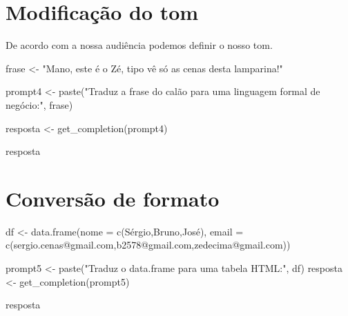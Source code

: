 \documentclass[
  letterpaper,
  paper=6in:9in,
  pagesize=pdftex,
  headinclude=on,
  footinclude=on,
  12pt]{scrbook}
\newenvironment{Shaded}{\begin{snugshade}}{\end{snugshade}}
\newcommand{\AttributeTok}[1]{\textcolor[rgb]{0.40,0.45,0.13}{#1}}
\newcommand{\FunctionTok}[1]{\textcolor[rgb]{0.28,0.35,0.67}{#1}}
\newcommand{\NormalTok}[1]{\textcolor[rgb]{0.00,0.23,0.31}{#1}}
\newcommand{\OtherTok}[1]{\textcolor[rgb]{0.00,0.23,0.31}{#1}}
\newcommand{\StringTok}[1]{\textcolor[rgb]{0.13,0.47,0.30}{#1}}
\begin{document}
\hypertarget{modificauxe7uxe3o-do-tom}{%
\section{Modificação do tom}\label{modificauxe7uxe3o-do-tom}}

De acordo com a nossa audiência podemos definir o nosso tom.

\begin{Shaded}
\begin{Highlighting}[]
\NormalTok{frase }\OtherTok{\textless{}{-}} \StringTok{"Mano, este é o Zé, tipo vê só as cenas desta lamparina!"} 

\NormalTok{prompt4 }\OtherTok{\textless{}{-}} \FunctionTok{paste}\NormalTok{(}\StringTok{"Traduz a frase do calão para uma linguagem formal de negócio:"}\NormalTok{, frase)}

\NormalTok{resposta }\OtherTok{\textless{}{-}} \FunctionTok{get\_completion}\NormalTok{(prompt4)}

\NormalTok{resposta}
\end{Highlighting}
\end{Shaded}

\hypertarget{conversuxe3o-de-formato}{%
\section{Conversão de formato}\label{conversuxe3o-de-formato}}

\begin{Shaded}
\begin{Highlighting}[]
\NormalTok{df }\OtherTok{\textless{}{-}} \FunctionTok{data.frame}\NormalTok{(}\AttributeTok{nome =} \FunctionTok{c}\NormalTok{(}\StringTok{\textquotesingle{}Sérgio\textquotesingle{}}\NormalTok{,}\StringTok{\textquotesingle{}Bruno\textquotesingle{}}\NormalTok{,}\StringTok{\textquotesingle{}José\textquotesingle{}}\NormalTok{),}
                 \AttributeTok{email =} \FunctionTok{c}\NormalTok{(}\StringTok{\textquotesingle{}sergio.cenas@gmail.com\textquotesingle{}}\NormalTok{,}\StringTok{\textquotesingle{}b2578@gmail.com\textquotesingle{}}\NormalTok{,}\StringTok{\textquotesingle{}zedecima@gmail.com\textquotesingle{}}\NormalTok{))}

\NormalTok{prompt5 }\OtherTok{\textless{}{-}} \FunctionTok{paste}\NormalTok{(}\StringTok{"Traduz o data.frame para uma tabela HTML:"}\NormalTok{, }
\NormalTok{                df)}
\NormalTok{resposta }\OtherTok{\textless{}{-}} \FunctionTok{get\_completion}\NormalTok{(prompt5)}

\NormalTok{resposta}
\end{Highlighting}
\end{Shaded}
\end{document}

